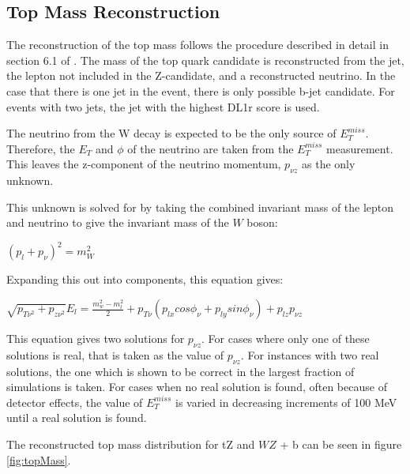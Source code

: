 
\subsection{Top Mass Reconstruction}
\label{subsec:topMass}

 The reconstruction of the top mass follows the procedure described in detail in section 6.1 of \cite{ttZ_paper}. The mass of the top quark candidate is reconstructed from the jet, the lepton not included in the Z-candidate, and a reconstructed neutrino. In the case that there is one jet in the event, there is only possible b-jet candidate. For events with two jets, the jet with the highest DL1r score is used.

The neutrino from the W decay is expected to be the only source of $E_T^{miss}$. Therefore, the $E_T$ and $\phi$ of the neutrino are taken from the $E_T^{miss}$ measurement. This leaves the z-component of the neutrino momentum, $p_{\nu z}$ as the only unknown.

This unknown is solved for by taking the combined invariant mass of the lepton and neutrino to give the invariant mass of the $W$ boson:

\begin{center}
   $(p_l + p_{\nu})^2 = m_W^2$ \\ 
\end{center} 

Expanding this out into components, this equation gives:

\begin{center}
   $\sqrt{p_{T\nu^2}+p_{z\nu^2}}E_l = \frac{m^2_w-m^2_l}{2}+p_{T\nu}(p_{lx} cos\phi_\nu + p_{ly} sin \phi_\nu) + p_{lz} p_{\nu z}$ \\ 
\end{center} 

This equation gives two solutions for $p_{\nu z}$. For cases where only one of these solutions is real, that is taken as the value of $p_{\nu z}$. For instances with two real solutions, the one which is shown to be correct in the largest fraction of simulations is taken. For cases when no real solution is found, often because of detector effects, the value of $E_T^{miss}$ is varied in decreasing increments of 100 MeV until a real solution is found.

The reconstructed top mass distribution for tZ and $WZ$ + b can be seen in figure \ref{fig:topMass}.

